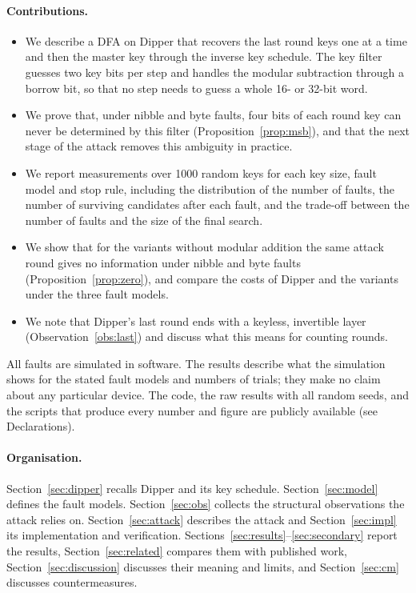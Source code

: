 \documentclass[pdflatex,sn-mathphys-num]{sn-jnl}
\theoremstyle{thmstyleone}%
\theoremstyle{thmstylethree}%
\begin{document}
\paragraph{Contributions.}
\begin{itemize}
\item We describe a DFA on Dipper that recovers the last round keys one at a time and then the
master key through the inverse key schedule. The key filter guesses two key bits per step and
handles the modular subtraction through a borrow bit, so that no step needs to guess a whole 16- or
32-bit word.
\item We prove that, under nibble and byte faults, four bits of each round key can never be
determined by this filter (Proposition~\ref{prop:msb}), and that the next stage of the attack
removes this ambiguity in practice.
\item We report measurements over 1000 random keys for each key size, fault model and stop rule,
including the distribution of the number of faults, the number of surviving candidates after each
fault, and the trade-off between the number of faults and the size of the final search.
\item We show that for the variants without modular addition the same attack round gives no
information under nibble and byte faults (Proposition~\ref{prop:zero}), and compare the costs of
Dipper and the variants under the three fault models.
\item We note that Dipper's last round ends with a keyless, invertible layer
(Observation~\ref{obs:last}) and discuss what this means for counting rounds.
\end{itemize}
All faults are simulated in software. The results describe what the simulation shows for the
stated fault models and numbers of trials; they make no claim about any particular device. The code,
the raw results with all random seeds, and the scripts that produce every number and figure are
publicly available (see Declarations).

\paragraph{Organisation.} Section~\ref{sec:dipper} recalls Dipper and its key schedule.
Section~\ref{sec:model} defines the fault models. Section~\ref{sec:obs} collects the structural
observations the attack relies on. Section~\ref{sec:attack} describes the attack and
Section~\ref{sec:impl} its implementation and verification. Sections~\ref{sec:results}--\ref{sec:secondary}
report the results, Section~\ref{sec:related} compares them with published work,
Section~\ref{sec:discussion} discusses their meaning and limits, and Section~\ref{sec:cm} discusses
countermeasures.
\end{document}
